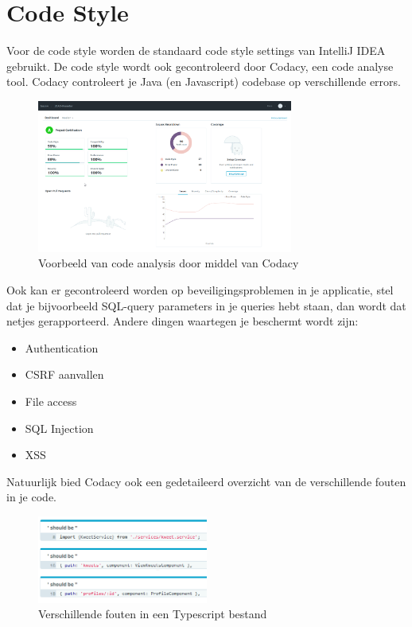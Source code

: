 \chapter{Code Style}
Voor de code style worden de standaard code style settings van IntelliJ IDEA gebruikt.
De code style wordt ook gecontroleerd door Codacy, een code analyse tool.
Codacy controleert je Java (en Javascript) codebase op verschillende errors.

\begin{figure}[H]
	\includegraphics[width=0.75\textwidth]{images/StaticCodeAnalysis.png}
	\caption{Voorbeeld van code analysis door middel van Codacy}
	\label{fig:StaticCodeAnalyses}
\end{figure}

Ook kan er gecontroleerd worden op beveiligingsproblemen in je applicatie, stel dat je bijvoorbeeld SQL-query parameters in je queries hebt staan, dan wordt dat netjes gerapporteerd.
Andere dingen waartegen je beschermt wordt zijn:
\begin{itemize}
	\setlength\itemsep{0em}
	\item Authentication
	\item CSRF aanvallen
	\item File access
	\item SQL Injection
	\item XSS
\end{itemize}

Natuurlijk bied Codacy ook een gedetaileerd overzicht van de verschillende fouten in je code.
\begin{figure}[H]
	\centering\includegraphics[width=0.5\textwidth]{images/Codacy}
	\caption{Verschillende fouten in een Typescript bestand}
\end{figure}

